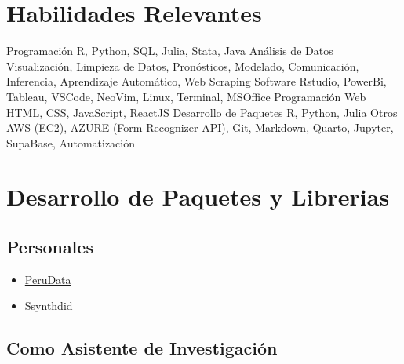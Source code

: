 \documentclass[11pt,a4paper,]{awesome-cv}
\providecommand{\tightlist}{%
	\setlength{\itemsep}{0pt}\setlength{\parskip}{0pt}}
\begin{document}
\newpage

\hypertarget{habilidades-relevantes}{%
\section{Habilidades Relevantes}\label{habilidades-relevantes}}

\begin{cvskills}  
\cvskill 
    {Programación}
    {R, Python, SQL, Julia, Stata, Java} 
\cvskill 
    {Análisis de Datos}
    {Visualización, Limpieza de Datos, Pronósticos, Modelado, Comunicación, Inferencia, Aprendizaje Automático, Web Scraping} 
\cvskill 
    {Software}
    {Rstudio, PowerBi, Tableau, VSCode, NeoVim, Linux, Terminal, MSOffice} 
\cvskill 
    {Programación Web}
    {HTML, CSS, JavaScript, ReactJS} 
\cvskill 
    {Desarrollo de Paquetes}
    {R, Python, Julia} 
\cvskill 
    {Otros}
    {AWS (EC2), AZURE (Form Recognizer API), Git, Markdown, Quarto, Jupyter, SupaBase, Automatización} 
    
\end{cvskills}

\hypertarget{desarrollo-de-paquetes-y-librerias}{%
\section{Desarrollo de Paquetes y
Librerias}\label{desarrollo-de-paquetes-y-librerias}}

\hypertarget{personales}{%
\subsection{Personales}\label{personales}}

\small

\begin{itemize}
\tightlist
\item
  \href{https://github.com/TJhon/PeruData}{PeruData}
\item
  \href{https://github.com/TJhon/ssynthdid}{Ssynthdid} \normalsize
\end{itemize}

\hypertarget{como-asistente-de-investigaciuxf3n}{%
\subsection{Como Asistente de
Investigación}\label{como-asistente-de-investigaciuxf3n}}

\small
\end{document}
